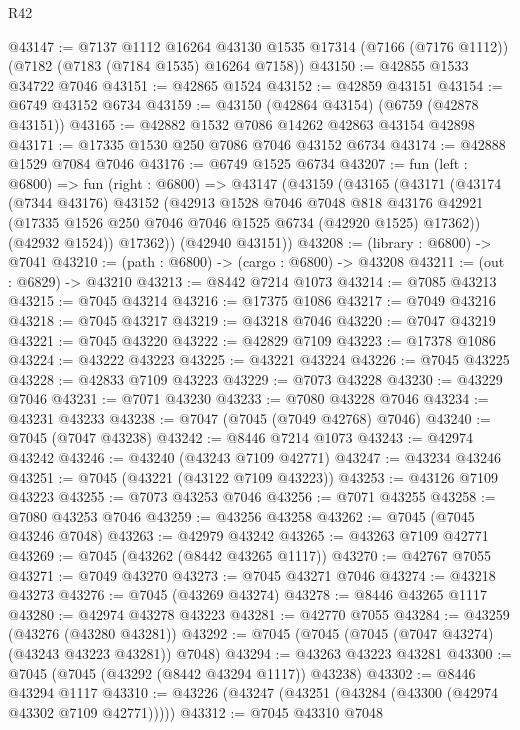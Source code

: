 \begin{lexlean}{R42}
\begin{coremodule}
{@43147 := @7137
    @1112
    @16264
    @43130
    @1535
    @17314
    (@7166 (@7176 @1112))
    (@7182 (@7183 (@7184 @1535) @16264 @7158))
@43150 := @42855 @1533 @34722 @7046
@43151 := @42865 @1524
@43152 := @42859 @43151
@43154 := @6749 @43152 @6734
@43159 := @43150 (@42864 @43154) (@6759 (@42878 @43151))
@43165 := @42882 @1532 @7086 @14262 @42863 @43154 @42898
@43171 := @17335 @1530 @250 @7086 @7046 @43152 @6734
@43174 := @42888 @1529 @7084 @7046
@43176 := @6749 @1525 @6734
@43207 := fun (left : @6800) =>
  fun (right : @6800) =>
  @43147
    (@43159
      (@43165
        (@43171
          (@43174
            (@7344 @43176)
            @43152
            (@42913
              @1528
              @7046
              @7048
              @818
              @43176
              @42921
              (@17335 @1526 @250 @7046 @7046 @1525 @6734 (@42920 @1525) @17362))
            (@42932 @1524))
          @17362))
      (@42940 @43151))
@43208 := (library : @6800) -> @7041
@43210 := (path : @6800) -> (cargo : @6800) -> @43208
@43211 := (out : @6829) -> @43210
@43213 := @8442 @7214 @1073
@43214 := @7085 @43213
@43215 := @7045 @43214
@43216 := @17375 @1086
@43217 := @7049 @43216
@43218 := @7045 @43217
@43219 := @43218 @7046
@43220 := @7047 @43219
@43221 := @7045 @43220
@43222 := @42829 @7109
@43223 := @17378 @1086
@43224 := @43222 @43223
@43225 := @43221 @43224
@43226 := @7045 @43225
@43228 := @42833 @7109 @43223
@43229 := @7073 @43228
@43230 := @43229 @7046
@43231 := @7071 @43230
@43233 := @7080 @43228 @7046
@43234 := @43231 @43233
@43238 := @7047 (@7045 (@7049 @42768) @7046)
@43240 := @7045 (@7047 @43238)
@43242 := @8446 @7214 @1073
@43243 := @42974 @43242
@43246 := @43240 (@43243 @7109 @42771)
@43247 := @43234 @43246
@43251 := @7045 (@43221 (@43122 @7109 @43223))
@43253 := @43126 @7109 @43223
@43255 := @7073 @43253 @7046
@43256 := @7071 @43255
@43258 := @7080 @43253 @7046
@43259 := @43256 @43258
@43262 := @7045 (@7045 @43246 @7048)
@43263 := @42979 @43242
@43265 := @43263 @7109 @42771
@43269 := @7045 (@43262 (@8442 @43265 @1117))
@43270 := @42767 @7055
@43271 := @7049 @43270
@43273 := @7045 @43271 @7046
@43274 := @43218 @43273
@43276 := @7045 (@43269 @43274)
@43278 := @8446 @43265 @1117
@43280 := @42974 @43278 @43223
@43281 := @42770 @7055
@43284 := @43259 (@43276 (@43280 @43281))
@43292 := @7045 (@7045 (@7045 (@7047 @43274) (@43243 @43223 @43281)) @7048)
@43294 := @43263 @43223 @43281
@43300 := @7045 (@7045 (@43292 (@8442 @43294 @1117)) @43238)
@43302 := @8446 @43294 @1117
@43310 := @43226 (@43247 (@43251 (@43284 (@43300 (@42974 @43302 @7109 @42771)))))
@43312 := @7045 @43310 @7048
}
\end{coremodule}
\end{lexlean}
